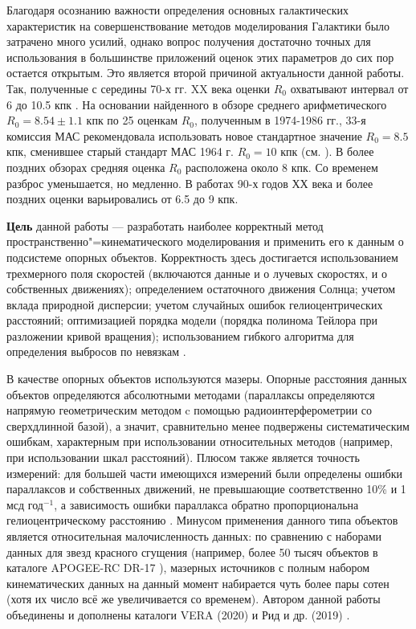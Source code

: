 \documentclass[a4paper, oneside, 14pt]{article}
\begin{document}
Благодаря осознанию важности определения основных галактических характеристик на совершенствование методов моделирования Галактики было затрачено много усилий, однако вопрос получения достаточно точных для использования в большинстве приложений оценок этих параметров до сих пор остается открытым. Это является второй причиной актуальности данной работы. Так, полученные с середины 70-х гг. XX века оценки $ R_0 $ охватывают интервал от 6 до 10.5 кпк \cite{K.L.1986, F.1987, R.1993}. На основании найденного в обзоре \cite{K.L.1986} среднего арифметического $ R_0 = 8.54 \pm 1.1 $ кпк по 25 оценкам $ R_0 $, полученным в 1974-1986 гг., 33-я комиссия МАС рекомендовала использовать новое стандартное значение $ R_0 = 8.5 $ кпк, сменившее старый стандарт МАС 1964 г. $ R_0 = 10 $ кпк (см. \cite{F.T.1991}). В более поздних обзорах \cite{R.1993, N.2004} средняя оценка $ R_0 $ расположена около 8 кпк. Со временем разброс уменьшается, но медленно. В работах 90-х годов ХХ века и более поздних оценки варьировались от 6.5 до 9 кпк.

\textbf{Цель} данной работы --- разработать наиболее корректный метод пространственно"=кинематического моделирования и применить его к данным о подсистеме опорных объектов. Корректность здесь достигается использованием трехмерного поля скоростей (включаются данные и о лучевых скоростях, и о собственных движениях); определением остаточного движения Солнца; учетом вклада природной дисперсии; учетом случайных ошибок гелиоцентрических расстояний; оптимизацией порядка модели (порядка полинома Тейлора при разложении кривой вращения); использованием гибкого алгоритма для определения выбросов по невязкам \cite{N.2012}.

В качестве опорных объектов используются мазеры. Опорные расстояния данных объектов определяются абсолютными методами (параллаксы определяются напрямую геометрическим методом c помощью радиоинтерферометрии со сверхдлинной базой), а значит, сравнительно менее подвержены систематическим ошибкам, характерным при использовании относительных методов (например, при использовании шкал расстояний). Плюсом также является точность измерений: для большей части имеющихся измерений были определены ошибки параллаксов и собственных движений, не превышающие соответственно 10\% и 1 мсд год$^{-1}$, а зависимость ошибки параллакса обратно пропорциональна гелиоцентрическому расстоянию \cite{N.V.2018}. Минусом применения данного типа объектов является относительная малочисленность данных: по сравнению с наборами данных для звезд красного сгущения \cite{V.2019} (например, более 50 тысяч объектов в каталоге APOGEE-RC DR-17 \cite{DR17-APOGEE}), мазерных источников с полным набором кинематических данных на данный момент набирается чуть более пары сотен (хотя их число всё же увеличивается со временем). Автором данной работы объединены и дополнены каталоги VERA (2020) \cite{VERA.2020} и Рид и др. (2019) \cite{R.2019}.
\end{document}
